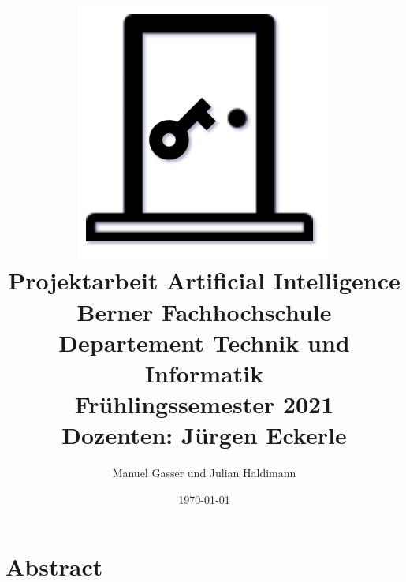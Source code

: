 \documentclass[12pt]{report}
\title{
    \includegraphics[scale=0.8]{content/pictures/front.png}\\
    \hfill \break
    {Projektarbeit Artificial Intelligence}\\
    {\large Berner Fachhochschule Departement Technik und Informatik}\\
    {\large Frühlingssemester 2021}\\
    {\large Dozenten: Jürgen Eckerle}\\
}
\author{Manuel Gasser und Julian Haldimann}
\date{\today}
\begin{document}
    \maketitle

    \chapter{Abstract}
    

    \tableofcontents
    
	
    
	

    \printglossaries

    \listoftables

    \listoffigures
\end{document}
